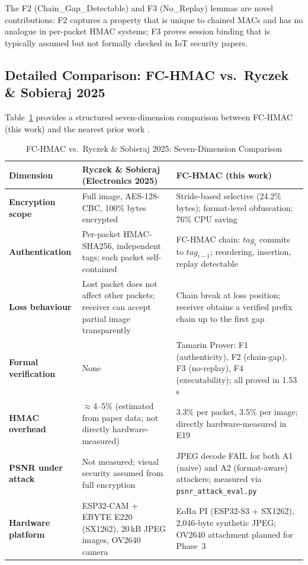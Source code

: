 \documentclass[journal]{IEEEtran}
\begin{document}
The F2 (Chain\_Gap\_Detectable) and F3 (No\_Replay) lemmas are novel
contributions: F2 captures a property that is unique to chained MACs and has
no analogue in per-packet HMAC systems; F3 proves session binding that is
typically assumed but not formally checked in IoT security papers.

\subsection{Detailed Comparison: FC-HMAC vs.\ Ryczek \& Sobieraj 2025}

Table~\ref{tab:comparison} provides a structured seven-dimension comparison
between FC-HMAC (this work) and the nearest prior work \cite{ryczek2025}.

\begin{table}[ht]
\centering
\caption{FC-HMAC vs.\ Ryczek \& Sobieraj 2025: Seven-Dimension Comparison}
\label{tab:comparison}
\begin{tabular}{p{2.6cm}p{5.0cm}p{5.8cm}}
\toprule
Dimension &
  Ryczek \& Sobieraj (Electronics 2025) \cite{ryczek2025} &
  \textbf{FC-HMAC (this work)} \\
\midrule
\textbf{Encryption scope} &
  Full image, AES-128-CBC, 100\% bytes encrypted &
  Stride-based selective (24.2\% bytes); format-level obfuscation; 76\% CPU saving \\
\addlinespace
\textbf{Authentication} &
  Per-packet HMAC-SHA256, independent tags; each packet self-contained &
  FC-HMAC chain: $\mathit{tag}_i$ commits to $\mathit{tag}_{i-1}$; reordering, insertion, replay detectable \\
\addlinespace
\textbf{Loss behaviour} &
  Lost packet does not affect other packets; receiver can accept partial image transparently &
  Chain break at loss position; receiver obtains a verified prefix chain up to the first gap \\
\addlinespace
\textbf{Formal verification} &
  None &
  Tamarin Prover: F1 (authenticity), F2 (chain-gap), F3 (no-replay), F4 (executability); all proved in 1.53\,s \\
\addlinespace
\textbf{HMAC overhead} &
  $\approx$4--5\% (estimated from paper data; not directly hardware-measured) &
  3.3\% per packet, 3.5\% per image; directly hardware-measured in E19 \\
\addlinespace
\textbf{PSNR under attack} &
  Not measured; visual security assumed from full encryption &
  JPEG decode FAIL for both A1 (naive) and A2 (format-aware) attackers; measured via \texttt{psnr\_attack\_eval.py} \\
\addlinespace
\textbf{Hardware platform} &
  ESP32-CAM + EBYTE E220 (SX1262), 20\,kB JPEG images, OV2640 camera &
  EoRa PI (ESP32-S3 + SX1262), 2{,}046-byte synthetic JPEG; OV2640 attachment planned for Phase~3 \\
\bottomrule
\end{tabular}
\end{table}
\end{document}
